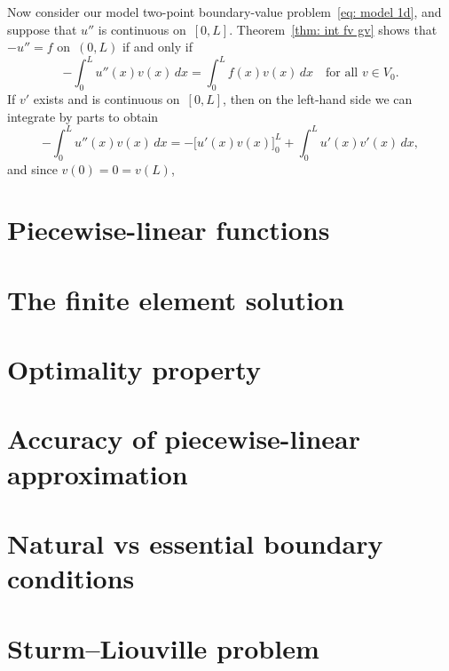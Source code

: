 Now consider our model two-point boundary-value problem~\eqref{eq: model 1d},
and suppose that $u''$ is continuous on~$[0,L]$.  Theorem~\ref{thm: int fv gv}
shows that $-u''=f$ on~$(0,L)$ if and only if
\[
-\int_0^L u''(x)v(x)\,dx=\int_0^Lf(x)v(x)\,dx\quad\text{for all $v\in V_0$.}
\]
If $v'$ exists and is continuous on~$[0,L]$, then on the left-hand side we can 
integrate by parts to obtain
\[
-\int_0^L u''(x)v(x)\,dx=-\bigl[u'(x)v(x)\bigr]_0^L+\int_0^Lu'(x)v'(x)\,dx,
\]
and since $v(0)=0=v(L)$,


\section{Piecewise-linear functions}

\section{The finite element solution}

\section{Optimality property}

\section{Accuracy of piecewise-linear approximation}

\section{Natural vs essential boundary conditions}

\section{Sturm--Liouville problem}
